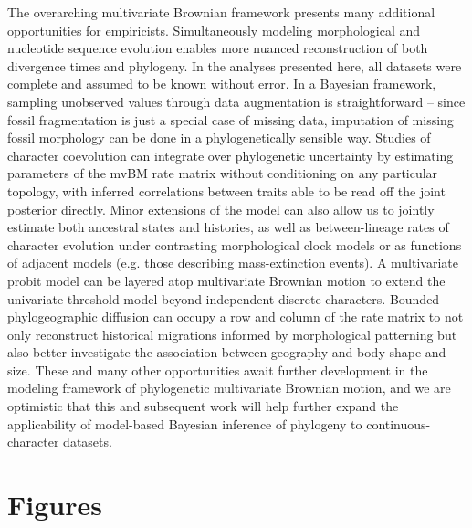 The overarching multivariate Brownian framework presents many additional opportunities for empiricists. Simultaneously modeling morphological and nucleotide sequence evolution enables more nuanced reconstruction of both divergence times and phylogeny. In the analyses presented here, all datasets were complete and assumed to be known without error. In a Bayesian framework, sampling unobserved values through data augmentation is straightforward – since fossil fragmentation is just a special case of missing data, imputation of missing fossil morphology can be done in a phylogenetically sensible way.  Studies of character coevolution can integrate over phylogenetic uncertainty by estimating parameters of the mvBM rate matrix without conditioning on any particular topology, with inferred correlations between traits able to be read off the joint posterior directly. Minor extensions of the model can also allow us to jointly estimate both ancestral states and histories, as well as between-lineage rates of character evolution under contrasting morphological clock models or as functions of adjacent models (e.g. those describing mass-extinction events). A multivariate probit model can be layered atop multivariate Brownian motion to extend the univariate threshold model \citep[e.g. ][]{felsensteinUsingQuantitativeGenetic2005, felsensteinComparativeMethodBoth2012, revellAncestralCharacterEstimation2014a} beyond independent discrete characters. Bounded phylogeographic diffusion can occupy a row and column of the rate matrix to not only reconstruct historical migrations informed by morphological patterning but also better investigate the association between geography and body shape and size. These and many other opportunities await further development in the modeling framework of phylogenetic multivariate Brownian motion, and we are optimistic that this and subsequent work will help further expand the applicability of model-based Bayesian inference of phylogeny to continuous-character datasets.

\clearpage

\section{Figures}

